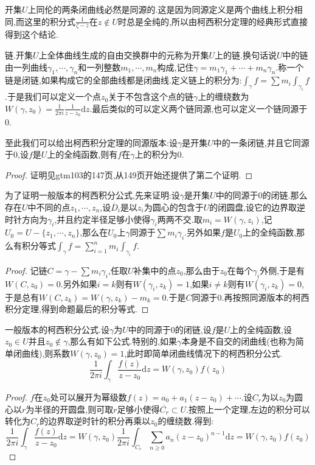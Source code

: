 开集$U$上同伦的两条闭曲线必然是同源的.这是因为同源定义是两个曲线上积分相同,而这里的积分式$\frac{1}{\zeta-z}$在$z\not\in U$时总是全纯的,所以由柯西积分定理的经典形式直接得到这个结论.

链.开集$U$上全体曲线生成的自由交换群中的元称为开集$U$上的链.换句话说$U$中的链由一列曲线$\gamma_1,\cdots,\gamma_n$和一列整数$m_1,\cdots,m_n$构成,记住$\gamma=m_1\gamma_1+\cdots+m_n\gamma_n$.称一个链是闭链,如果构成它的全部曲线都是闭曲线.定义链上的积分为:$\int_{\gamma}f=\sum m_i\int_{\gamma_i}f$.于是我们可以定义一个点$z_0$关于不包含这个点的链$\gamma$上的缠绕数为$W(\gamma,z_0)=\frac{1}{2\pi i}\frac{1}{z-z_0}\mathrm{d}z$.最后类似的可以定义两个链同源,也可以定义一个链同源于0.

至此我们可以给出柯西积分定理的同源版本:设$\gamma$是开集$U$中的一条闭链,并且它同源于0,设$f$是$U$上的全纯函数,则有$f$在$\gamma$上的积分为0.
\begin{proof}
	
	证明见gtm103的147页,从149页开始还提供了第二个证明.
\end{proof}

为了证明一般版本的柯西积分公式,先来证明:设$\gamma$是开集$U$中的同源于0的闭链.那么存在$U$中不同的点$z_1,\cdots,z_n$,设$\overline{D}_i$是以$z_i$为圆心的包含于$U$的闭圆盘,设它的边界取逆时针方向为$\gamma_i$,并且约定半径足够小使得$\gamma_i$两两不交.取$m_i=W(\gamma,z_i)$,记$U_0=U-\{z_1,\cdots,z_n\}$,那么在$U_0$上$\gamma$同源于$\sum m_i\gamma_i$.另外如果$f$是$U_0$上的全纯函数,那么有积分等式$\int_{\gamma}f=\sum_{i=1}^nm_i\int_{\gamma_i}f$.
\begin{proof}
	
	记链$C=\gamma-\sum m_i\gamma_i$,任取$U$补集中的点$z_0$,那么由于$z_0$在每个$\gamma_i$外侧,于是有$W(C,z_0)=0$.另外如果$i=k$则有$W(\gamma_i,z_k)=1$,如果$i\not=k$则有$W(\gamma_i,z_k)=0$,于是总有$W(C,z_k)=W(\gamma,z_k)-m_k=0$.于是$C$同源于0.再按照同源版本的柯西积分定理,得到命题最后的积分等式.
\end{proof}

一般版本的柯西积分公式.设$\gamma$为$U$中的同源于0的闭链,设$f$是$U$上的全纯函数,设$z_0\in U$并且$z_0\not\in\gamma$,那么有如下公式.特别的,如果$\gamma$本身是不自交的闭曲线(也称为简单闭曲线),则系数$W(\gamma,z_0)=1$,此时即简单闭曲线情况下的柯西积分公式.
$$\frac{1}{2\pi i}\int_{\gamma}\frac{f(z)}{z-z_0}\mathrm{d}z=W(\gamma,z_0)f(z_0)$$
\begin{proof}
	
	$f$在$z_0$处可以展开为幂级数$f(z)=a_0+a_1(z-z_0)+\cdots$.设$C_r$为以$z_0$为圆心以$r$为半径的开圆盘,则可取$r$足够小使得$\overline{C_r}\subset U$.按照上一个定理,左边的积分可以转化为$C_r$的边界取逆时针的积分再乘以$z_0$的缠绕数.得到:
	$$\frac{1}{2\pi i}\int_{\gamma}\frac{f(z)}{z-z_0}\mathrm{d}z=W(\gamma,z_0)\frac{1}{2\pi i}\int_{C_r}\sum_{n\ge0}a_n(z-z_0)^{n-1}\mathrm{d}z=W(\gamma,z_0)f(z_0)$$
\end{proof}

